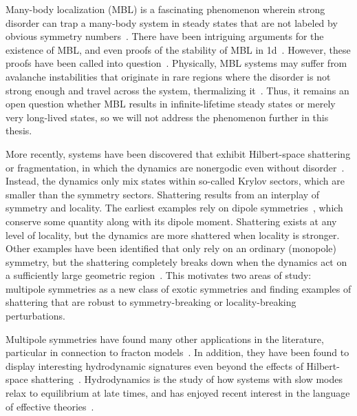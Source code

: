 Many-body localization (MBL) is a fascinating phenomenon wherein strong disorder can trap a many-body system in steady states that are not labeled by obvious symmetry numbers~\cite{Nandkishore2015MBL, Abanin2019MBL}. There have been intriguing arguments for the existence of MBL, and even proofs of the stability of MBL in 1d~\cite{Imbrie2016MBL}. However, these proofs have been called into question~\cite{Sels2021Obstruction}. Physically, MBL systems may suffer from avalanche instabilities that originate in rare regions where the disorder is not strong enough and travel across the system, thermalizing it~\cite{Leonard2023Probing, Morningstar2022, Ha2023Resonances}. Thus, it remains an open question whether MBL results in infinite-lifetime steady states or merely very long-lived states, so we will not address the phenomenon further in this thesis. 

More recently, systems have been discovered that exhibit Hilbert-space shattering or fragmentation, in which the dynamics are nonergodic even without disorder~\cite{Khemani2020Localization, Sala2020Fragmentation, Moudgalya2022Thermalization}. Instead, the dynamics only mix states within so-called Krylov sectors, which are smaller than the symmetry sectors. Shattering results from an interplay of symmetry and locality. The earliest examples rely on dipole symmetries~\cite{Pai2019Localization}, which conserve some quantity along with its dipole moment. Shattering exists at any level of locality, but the dynamics are more shattered when locality is stronger. Other examples have been identified that only rely on an ordinary (monopole) symmetry, but the shattering completely breaks down when the dynamics act on a sufficiently large geometric region~\cite{Caha2018PairFlip, Moudgalya2022Commutant}. This motivates two areas of study: multipole symmetries as a new class of exotic symmetries and finding examples of shattering that are robust to symmetry-breaking or locality-breaking perturbations.

Multipole symmetries have found many other applications in the literature, particular in connection to fracton models~\cite{Gromov2019Multipole, Bulmash2023Multipole, Sala2022Modulated}. In addition, they have been found to display interesting hydrodynamic signatures even beyond the effects of Hilbert-space shattering~\cite{Gromov2020Fracton, Iaconis2019Subdiffusion, Iaconis2021Multipole, Grosvenor2021Hydrodynamics, Osborne2021FractonFluids, Feldmeier2020Anomalous}. Hydrodynamics is the study of how systems with slow modes relax to equilibrium at late times, and has enjoyed recent interest in the language of effective theories~\cite{Crossley2017Effective, Haehl2016Fluid, Jensen2018Dissipative, Glorioso2017Effective, Liu2018Lectures}.

